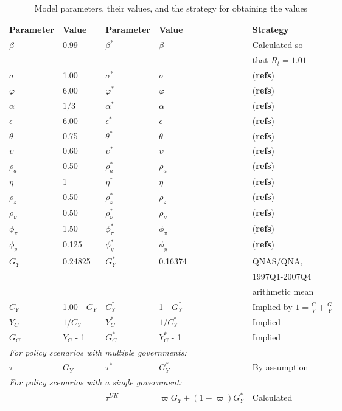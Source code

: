 \begin{table}[H] \label{table:model_parameters}
    \centering
    \begin{tabular}{ll|lll}
        Parameter & Value & Parameter & Value & Strategy \\
        \hline
        \hline
        $\beta$ & 0.99 & $\beta^*$ & $\beta$ & Calculated so \\ 
        & & & &that $R_t = 1.01$\\
        $\sigma$ & 1.00 & $\sigma^*$ & $\sigma$ & (\textbf{refs})\\
        $\varphi$ & 6.00 & $\varphi^*$ & $\varphi$ & (\textbf{refs})\\
        $\alpha$ & $1/3$ & $\alpha^*$ & $\alpha$ & (\textbf{refs})\\
        $\epsilon$ & 6.00 & $\epsilon^*$ & $\epsilon$ & (\textbf{refs})\\
        $\theta$ & 0.75 & $\theta^*$ & $\theta$ & (\textbf{refs})\\
        $\upsilon$ & 0.60 & $\upsilon^*$ & $\upsilon$ & (\textbf{refs})\\
        $\rho_a$ & 0.50 & $\rho_a^*$ & $\rho_a$ & (\textbf{refs})\\
        $\eta$ & 1 & $\eta^*$ & $\eta$ & (\textbf{refs})\\
        $\rho_z$ & 0.50 & $\rho_z^*$ & $\rho_z$ & (\textbf{refs})\\
        $\rho_\nu$ & 0.50 & $\rho^*_\nu$ & $\rho_\nu$ & (\textbf{refs})\\
        $\phi_\pi$ & 1.50 & $\phi^*_\pi$ & $\phi_\pi$ & (\textbf{refs})\\
        $\phi_y$ & 0.125 & $\phi^*_y$ & $\phi_y$ & (\textbf{refs})\\
        $G_Y$ & 0.24825 & $G_Y^*$ & 0.16374 & QNAS/QNA, \\ & & & &1997Q1-2007Q4\\ &&&& arithmetic mean\\
        $C_Y$ & 1.00 - $G_Y$ & $C_Y^*$ & 1 - $G_Y^*$ & Implied by $1=\frac{C}{Y} + \frac{G}{Y}$\\
        $Y_C$ & $1/{C_Y}$ & $Y_C^*$ & $1/{C_Y^*}$ & Implied \\
        $G_C$ & $Y_C$ - 1 & $G_C^*$ & $Y_C^*$ - 1 & Implied \\
        \multicolumn{5}{l}{\textit{For policy scenarios with multiple governments:}} \\
        $\tau$ & $G_Y$ & $\tau^*$ & $G_Y^*$ & By assumption\\
        \multicolumn{5}{l}{\textit{For policy scenarios with a single government:}} \\
         &&$\tau^{UK}$    & $\varpi G_Y + (1-\varpi)G^*_Y$  & Calculated\\
    \end{tabular}
    \caption{Model parameters, their values, and the strategy for obtaining the values}
\end{table}

